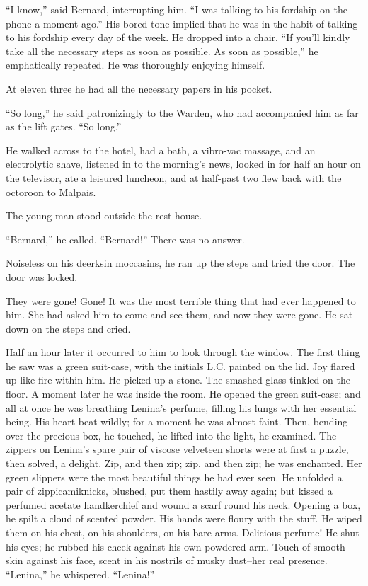 \documentclass[12pt]{report}
\begin{document}
``I know,'' said Bernard, interrupting him. ``I was talking to his
fordship on the phone a moment ago.'' His bored tone implied that he was
in the habit of talking to his fordship every day of the week. He
dropped into a chair. ``If you'll kindly take all the necessary steps as
soon as possible. As soon as possible,'' he emphatically repeated. He
was thoroughly enjoying himself.

At eleven three he had all the necessary papers in his pocket.

``So long,'' he said patronizingly to the Warden, who had accompanied
him as far as the lift gates. ``So long.''

He walked across to the hotel, had a bath, a vibro-vac massage, and an
electrolytic shave, listened in to the morning's news, looked in for
half an hour on the televisor, ate a leisured luncheon, and at half-past
two flew back with the octoroon to Malpais.

The young man stood outside the rest-house.

``Bernard,'' he called. ``Bernard!'' There was no answer.

Noiseless on his deerksin moccasins, he ran up the steps and tried the
door. The door was locked.

They were gone! Gone! It was the most terrible thing that had ever
happened to him. She had asked him to come and see them, and now they
were gone. He sat down on the steps and cried.

Half an hour later it occurred to him to look through the window. The
first thing he saw was a green suit-case, with the initials L.C. painted
on the lid. Joy flared up like fire within him. He picked up a stone.
The smashed glass tinkled on the floor. A moment later he was inside the
room. He opened the green suit-case; and all at once he was breathing
Lenina's perfume, filling his lungs with her essential being. His heart
beat wildly; for a moment he was almost faint. Then, bending over the
precious box, he touched, he lifted into the light, he examined. The
zippers on Lenina's spare pair of viscose velveteen shorts were at first
a puzzle, then solved, a delight. Zip, and then zip; zip, and then zip;
he was enchanted. Her green slippers were the most beautiful things he
had ever seen. He unfolded a pair of zippicamiknicks, blushed, put them
hastily away again; but kissed a perfumed acetate handkerchief and wound
a scarf round his neck. Opening a box, he spilt a cloud of scented
powder. His hands were floury with the stuff. He wiped them on his
chest, on his shoulders, on his bare arms. Delicious perfume! He shut
his eyes; he rubbed his cheek against his own powdered arm. Touch of
smooth skin against his face, scent in his nostrils of musky dust--her
real presence. ``Lenina,'' he whispered. ``Lenina!''
\end{document}
